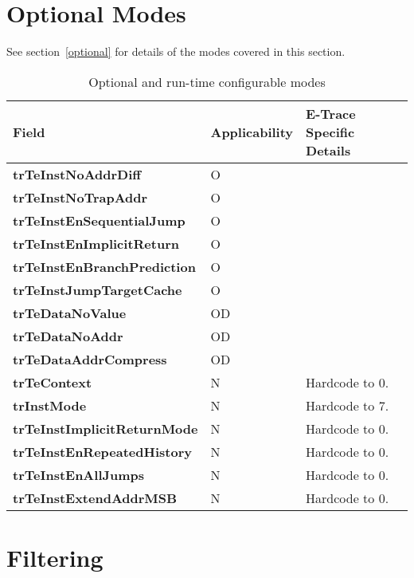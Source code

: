 \section{Optional Modes} \label{sec:ctl-modes}

See section~\ref{optional} for details of the modes covered in this section.

\begin{table}[htp]
  \centering
  \caption{Optional and run-time configurable modes}
  \label{tab:ctl-resync}
  \begin{tabulary}{\textwidth}{|l|l|p{90mm}|}
    \hline
    {\bf Field} & {\bf Applicability} & {\bf E-Trace Specific Details} \\
    \hline
    \textbf{trTeInstNoAddrDiff} & O & \\
    \hline
    \textbf{trTeInstNoTrapAddr} & O & \\
    \hline
    \textbf{trTeInstEnSequentialJump} & O & \\
    \hline
    \textbf{trTeInstEnImplicitReturn} & O & \\
    \hline
    \textbf{trTeInstEnBranchPrediction} & O & \\
    \hline
    \textbf{trTeInstJumpTargetCache} & O & \\
    \hline
    \textbf{trTeDataNoValue} & OD & \\
    \hline
    \textbf{trTeDataNoAddr} & OD & \\
    \hline
    \textbf{trTeDataAddrCompress} & OD & \\
    \hline
    \textbf{trTeContext} & N & Hardcode to 0.\\
    \hline
    \textbf{trInstMode} & N & Hardcode to 7.\\
    \hline
    \textbf{trTeInstImplicitReturnMode} & N & Hardcode to 0.\\
    \hline
    \textbf{trTeInstEnRepeatedHistory} & N & Hardcode to 0.\\
    \hline
    \textbf{trTeInstEnAllJumps} & N & Hardcode to 0.\\
    \hline
    \textbf{trTeInstExtendAddrMSB} & N & Hardcode to 0.\\
    \hline
  \end{tabulary}
\end{table}

\section{Filtering} \label{sec:ctl-filter}

